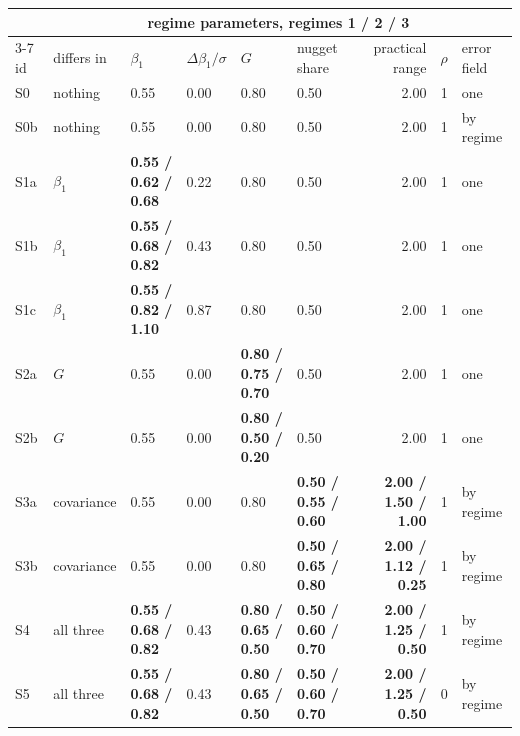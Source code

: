 \begin{tabular}{llllllrrl}
\toprule
& & \multicolumn{5}{c}{regime parameters, regimes 1 / 2 / 3} & & \\
\cmidrule(lr){3-7}
id & differs in & $\beta_1$ & $\Delta\beta_1/\sigma$ & $G$ & nugget share & practical range & $\rho$ & error field \\
\midrule
S0 & nothing & 0.55 & 0.00 & 0.80 & 0.50 & 2.00 & 1 & one \\
S0b & nothing & 0.55 & 0.00 & 0.80 & 0.50 & 2.00 & 1 & by regime \\
S1a & $\beta_1$ & \textbf{0.55 / 0.62 / 0.68} & 0.22 & 0.80 & 0.50 & 2.00 & 1 & one \\
S1b & $\beta_1$ & \textbf{0.55 / 0.68 / 0.82} & 0.43 & 0.80 & 0.50 & 2.00 & 1 & one \\
S1c & $\beta_1$ & \textbf{0.55 / 0.82 / 1.10} & 0.87 & 0.80 & 0.50 & 2.00 & 1 & one \\
S2a & $G$ & 0.55 & 0.00 & \textbf{0.80 / 0.75 / 0.70} & 0.50 & 2.00 & 1 & one \\
S2b & $G$ & 0.55 & 0.00 & \textbf{0.80 / 0.50 / 0.20} & 0.50 & 2.00 & 1 & one \\
S3a & covariance & 0.55 & 0.00 & 0.80 & \textbf{0.50 / 0.55 / 0.60} & \textbf{2.00 / 1.50 / 1.00} & 1 & by regime \\
S3b & covariance & 0.55 & 0.00 & 0.80 & \textbf{0.50 / 0.65 / 0.80} & \textbf{2.00 / 1.12 / 0.25} & 1 & by regime \\
S4 & all three & \textbf{0.55 / 0.68 / 0.82} & 0.43 & \textbf{0.80 / 0.65 / 0.50} & \textbf{0.50 / 0.60 / 0.70} & \textbf{2.00 / 1.25 / 0.50} & 1 & by regime \\
S5 & all three & \textbf{0.55 / 0.68 / 0.82} & 0.43 & \textbf{0.80 / 0.65 / 0.50} & \textbf{0.50 / 0.60 / 0.70} & \textbf{2.00 / 1.25 / 0.50} & 0 & by regime \\
\bottomrule
\end{tabular}
